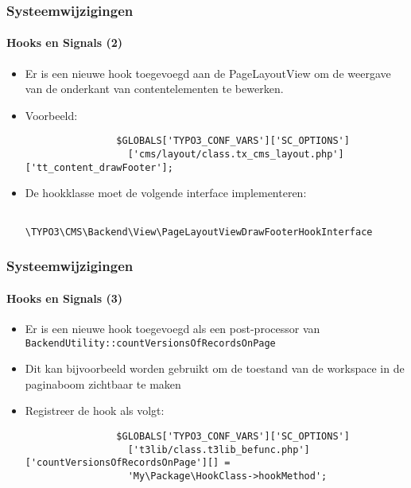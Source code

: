 \begin{frame}[fragile]
	\frametitle{Systeemwijzigingen}
	\framesubtitle{Hooks en Signals (2)}

	\begin{itemize}

		\item Er is een nieuwe hook toegevoegd aan de PageLayoutView om de weergave 
			van de onderkant van contentelementen te bewerken.

		\item Voorbeeld:
			\begin{lstlisting}
				$GLOBALS['TYPO3_CONF_VARS']['SC_OPTIONS']
				  ['cms/layout/class.tx_cms_layout.php']['tt_content_drawFooter'];
			\end{lstlisting}

		\item De hookklasse moet de volgende interface implementeren:
			\begin{lstlisting}
				\TYPO3\CMS\Backend\View\PageLayoutViewDrawFooterHookInterface
			\end{lstlisting}

	\end{itemize}

\end{frame}


\begin{frame}[fragile]
	\frametitle{Systeemwijzigingen}
	\framesubtitle{Hooks en Signals (3)}

	\begin{itemize}

		\item Er is een nieuwe hook toegevoegd als een post-processor van
			\small
				\texttt{BackendUtility::countVersionsOfRecordsOnPage}
			\normalsize

		\item Dit kan bijvoorbeeld worden gebruikt om de toestand van de workspace in de paginaboom zichtbaar te maken
		\item Registreer de hook als volgt:

			\begin{lstlisting}
				$GLOBALS['TYPO3_CONF_VARS']['SC_OPTIONS']
				  ['t3lib/class.t3lib_befunc.php']['countVersionsOfRecordsOnPage'][] =
				  'My\Package\HookClass->hookMethod';
			\end{lstlisting}

	\end{itemize}

\end{frame}

